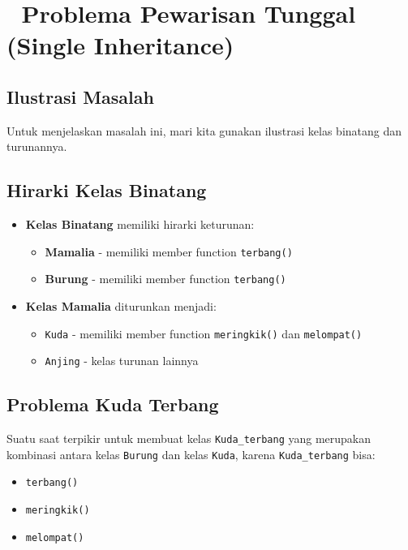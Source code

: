\section{🎯 Problema Pewarisan Tunggal (Single Inheritance)}\label{problema-pewarisan-tunggal-single-inheritance}

\subsection{Ilustrasi Masalah}

Untuk menjelaskan masalah ini, mari kita gunakan ilustrasi kelas binatang dan turunannya.

\subsection{Hirarki Kelas Binatang}

\begin{itemize}
\item \textbf{Kelas Binatang} memiliki hirarki keturunan:
  \begin{itemize}
  \item \textbf{Mamalia} - memiliki member function \texttt{terbang()}
  \item \textbf{Burung} - memiliki member function \texttt{terbang()}
  \end{itemize}
\item \textbf{Kelas Mamalia} diturunkan menjadi:
  \begin{itemize}
  \item \texttt{Kuda} - memiliki member function \texttt{meringkik()} dan \texttt{melompat()}
  \item \texttt{Anjing} - kelas turunan lainnya
  \end{itemize}
\end{itemize}

\subsection{Problema Kuda Terbang}

Suatu saat terpikir untuk membuat kelas \texttt{Kuda\_terbang} yang merupakan kombinasi antara kelas \texttt{Burung} dan kelas \texttt{Kuda}, karena \texttt{Kuda\_terbang} bisa:
\begin{itemize}
\item \texttt{terbang()}
\item \texttt{meringkik()}
\item \texttt{melompat()}
\end{itemize}

